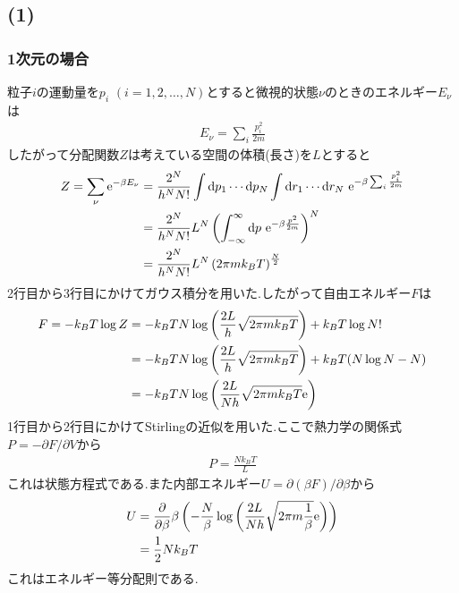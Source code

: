 \subsection*{(1)}
\subsubsection*{1次元の場合}
粒子$i$の運動量を$p_i$ $(i=1,2,\ldots,N)$とすると微視的状態$\nu$のときのエネルギー$E_\nu$は
\begin{align}
  E_\nu=\sum_i\frac{p_i^2}{2m}
\end{align}
したがって分配関数$Z$は考えている空間の体積(長さ)を$L$とすると
\begin{align}
  \begin{split}
    Z=\sum_\nu{\rm e}^{-\beta E_\nu}&=\frac{2^N}{h^NN!}\int{\rm d}p_1\cdots{\rm d}p_N\int{\rm d}r_1\cdots{\rm d}r_N\ {\rm e}^{-\beta\sum_i\frac{p_i^2}{2m}}\\
    &=\frac{2^N}{h^NN!}L^N\left(\int_{-\infty}^{\infty}{\rm d}p\ {\rm e}^{-\beta\frac{p^2}{2m}}\right)^N\\
    &=\frac{2^N}{h^NN!}L^N\left(2\pi mk_BT\right)^{\frac{N}{2}}
  \end{split}
\end{align}
2行目から3行目にかけてガウス積分を用いた.したがって自由エネルギー$F$は
\begin{align}
  \begin{split}
    F=-k_BT\log Z&=-k_BTN\log\left(\frac{2L}{h}\sqrt{2\pi mk_BT}\right)+k_BT\log N!\\
    &=-k_BTN\log\left(\frac{2L}{h}\sqrt{2\pi mk_BT}\right)+k_BT(N\log N-N)\\
    &=-k_BTN\log\left(\frac{2L}{Nh}\sqrt{2\pi mk_BT}{\rm e}\right)
  \end{split}
\end{align}
1行目から2行目にかけてStirlingの近似を用いた.ここで熱力学の関係式$P=-\partial F/\partial V$から
\begin{align}
  P=\frac{Nk_BT}{L}
\end{align}
これは状態方程式である.また内部エネルギー$U=\partial(\beta F)/\partial\beta$から
\begin{align}
  \begin{split}
    U&=\frac{\partial}{\partial\beta}\beta\left(-\frac{N}{\beta}\log\left(\frac{2L}{Nh}\sqrt{2\pi m\frac{1}{\beta}}{\rm e}\right)\right)\\
    &=\frac{1}{2}Nk_BT
  \end{split}
\end{align}
これはエネルギー等分配則である.
\clearpage
